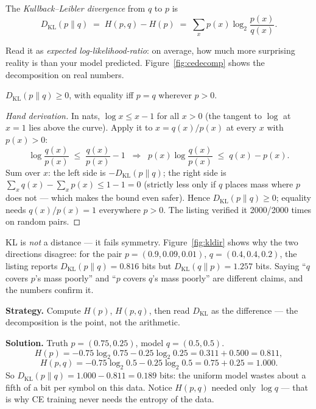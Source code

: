 \begin{definition}[KL divergence]\label{def:kl}
The \emph{Kullback--Leibler divergence} from $q$
to $p$ is
\[
  D_{\mathrm{KL}}(p\|q) \;=\; H(p,q) - H(p)
  \;=\; \sum_x p(x)\log_2\frac{p(x)}{q(x)}.
\]
\end{definition}

Read it as \emph{expected log-likelihood-ratio}: on average, how much
more surprising reality is than your model predicted.
Figure~\ref{fig:cedecomp} shows the decomposition on real numbers.

\begin{theorem}\label{thm:gibbs}
$D_{\mathrm{KL}}(p\|q)\ge 0$, with equality iff $p=q$ wherever
$p>0$.
\end{theorem}

\begin{proof}[Hand derivation]
In nats, $\log x\le x-1$ for all $x>0$ (the tangent to $\log$ at $x=1$
lies above the curve). Apply it to $x=q(x)/p(x)$ at every $x$ with
$p(x)>0$:
\[
\log\frac{q(x)}{p(x)} \;\le\; \frac{q(x)}{p(x)} - 1
\;\;\Longrightarrow\;\;
p(x)\log\frac{q(x)}{p(x)} \;\le\; q(x) - p(x).
\]
Sum over $x$: the left side is $-D_{\mathrm{KL}}(p\|q)$; the right side
is $\sum_{x} q(x) - \sum_{x} p(x) \le 1-1 = 0$ (strictly less only if $q$
places mass where $p$ does not --- which makes the bound even safer).
Hence $D_{\mathrm{KL}}(p\|q)\ge0$; equality needs
$q(x)/p(x)=1$ everywhere $p>0$. The listing verified it 2000/2000 times
on random pairs.
\end{proof}

KL is \emph{not} a distance --- it fails symmetry.
Figure~\ref{fig:kldir} shows why the two directions disagree: for the
pair $p=(0.9,0.09,0.01)$, $q=(0.4,0.4,0.2)$, the listing reports
$D_{\mathrm{KL}}(p\|q)=0.816$ bits but
$D_{\mathrm{KL}}(q\|p)=1.257$ bits. Saying ``$q$ covers $p$'s mass
poorly'' and ``$p$ covers $q$'s mass poorly'' are different claims, and
the numbers confirm it.

\begin{example}\label{ex:cehand}
\textbf{Strategy.} Compute $H(p)$, $H(p,q)$, then read
$D_{\mathrm{KL}}$ as the difference --- the decomposition is the
point, not the arithmetic.

\textbf{Solution.} Truth $p=(0.75,0.25)$, model $q=(0.5,0.5)$.
\[
H(p) = -0.75\log_2 0.75 - 0.25\log_2 0.25 = 0.311 + 0.500 = 0.811,
\]
\[
H(p,q) = -0.75\log_2 0.5 - 0.25\log_2 0.5 = 0.75 + 0.25 = 1.000.
\]
So $D_{\mathrm{KL}}(p\|q)=1.000-0.811=0.189$ bits: the
uniform model wastes about a fifth of a bit per symbol on this data.
Notice $H(p,q)$ needed only $\log q$ --- that is why CE training never
needs the entropy of the data.
\end{example}

